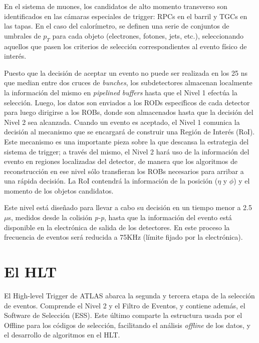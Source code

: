    En el sistema de muones, los candidatos de alto momento transverso son identificados en las c\'amaras especiales de trigger: RPCs en el barril y TGCs en las tapas. En el caso del calor\'imetro, se definen una serie de conjuntos de umbrales de $p_T$ para cada objeto (electrones, fotones, jets, etc.), seleccionando aquellos que pasen los criterios de selecci\'on correspondientes al evento f\'isico de inter\'es. 

   Puesto que la decisi\'on de aceptar un evento no puede ser realizada en los 25 ns que median entre dos cruces de \emph{bunches}, los subdetectores almacenan localmente la informaci\'on del mismo en \emph{pipelined buffers} hasta que el Nivel 1 efect\'ua la selecci\'on. Luego, los datos son enviados a los RODs especi\'ficos de cada detector para luego dirigirse a los ROBs, donde son almacenados hasta que la decisi\'on del Nivel 2 sea alcanzada. 
   Cuando un evento es aceptado, el Nivel 1 comunica la decisi\'on al mecanismo que se encargar\'a de construir una Regi\'on de Inter\'es (RoI). Este mecanismo es una importante pieza sobre la que descansa la estrategia del sistema de trigger; a trav\'es del mismo, el Nivel 2 har\'a uso de la informaci\'on del evento en regiones localizadas del detector, de manera que los algoritmos de reconstrucci\'on en ese nivel s\'olo transfieran los ROBs necesarios para arribar a una r\'apida decisi\'on. %
La RoI contendr\'a la informaci\'on de la posici\'on ($\eta$ y $\phi$) y el momento de los objetos candidatos.

   Este nivel est\'a dise\~nado para llevar a cabo su decisi\'on en un tiempo menor a 2.5 $\mu$s, medidos desde la colisi\'on \emph{p-p}, hasta que la informaci\'on del evento est\'a disponible en la electr\'onica de salida de los detectores. En este proceso la frecuencia de eventos ser\'a reducida a 75KHz (l\'imite fijado por la electr\'onica).

\section{El HLT}

 El High-level Trigger de ATLAS abarca la segunda y tercera etapa de la selecci\'on de eventos. Comprende el Nivel 2 y el Filtro de Eventos, y contiene adem\'as, el Software de Selecci\'on (ESS). Este \'ultimo comparte la estructura usada por el Offline para los c\'odigos de selecci\'on, facilitando el an\'alisis \emph{offline} de los datos, y el desarrollo de algoritmos en el HLT.

